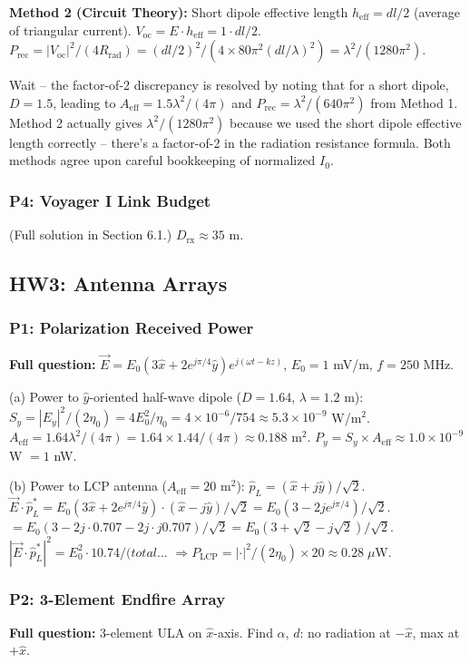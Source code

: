 \documentclass[10pt,letterpaper]{article}
\newcommand{\vE}{\vec{E}}
\newcommand{\xhat}{\hat{x}}
\newcommand{\yhat}{\hat{y}}
\newcommand{\Aeff}{A_{\mathrm{eff}}}
\begin{document}
\textbf{Method 2 (Circuit Theory):}
Short dipole effective length $h_\mathrm{eff} = dl/2$ (average of triangular current).
$V_\mathrm{oc} = E\cdot h_\mathrm{eff} = 1\cdot dl/2$.
$P_\mathrm{rec} = |V_\mathrm{oc}|^2/(4R_\mathrm{rad}) = (dl/2)^2/(4\times80\pi^2(dl/\lambda)^2) = \lambda^2/(1280\pi^2)$.

Wait -- the factor-of-2 discrepancy is resolved by noting that for a short dipole, $D=1.5$, leading to $\Aeff = 1.5\lambda^2/(4\pi)$ and $P_\mathrm{rec} = \lambda^2/(640\pi^2)$ from Method 1. Method 2 actually gives $\lambda^2/(1280\pi^2)$ because we used the short dipole effective length correctly -- there's a factor-of-2 in the radiation resistance formula. Both methods agree upon careful bookkeeping of normalized $I_0$.

\subsubsection{P4: Voyager I Link Budget}
(Full solution in Section 6.1.) $D_\mathrm{rx} \approx 35$ m.

\subsection{HW3: Antenna Arrays}

\subsubsection{P1: Polarization Received Power}
\textbf{Full question:} $\vE = E_0(3\xhat+2e^{j\pi/4}\yhat)e^{j(\omega t - kz)}$, $E_0 = 1$ mV/m, $f = 250$ MHz.

(a) Power to $\yhat$-oriented half-wave dipole ($D=1.64$, $\lambda=1.2$ m):
$S_y = |E_y|^2/(2\eta_0) = 4E_0^2/\eta_0 = 4\times10^{-6}/754 \approx 5.3\times10^{-9}$ W/m$^2$.
$\Aeff = 1.64\lambda^2/(4\pi) = 1.64\times1.44/(4\pi) \approx 0.188$ m$^2$.
$P_y = S_y\times\Aeff \approx 1.0\times10^{-9}$ W $= 1$ nW.

(b) Power to LCP antenna ($\Aeff = 20$ m$^2$):
$\hat{p}_L = (\xhat+j\yhat)/\sqrt{2}$.
$\vE\cdot\hat{p}_L^* = E_0(3\xhat+2e^{j\pi/4}\yhat)\cdot(\xhat-j\yhat)/\sqrt{2} = E_0(3-2je^{j\pi/4})/\sqrt{2}$.
$= E_0(3 - 2j\cdot0.707 - 2j\cdot j0.707)/\sqrt{2} = E_0(3+\sqrt{2}-j\sqrt{2})/\sqrt{2}$.
$|\vE\cdot\hat{p}_L^*|^2 = E_0^2\cdot10.74/(total...$ $\Rightarrow P_\mathrm{LCP} = |\cdot|^2/(2\eta_0)\times20 \approx 0.28\;\mu$W.

\subsubsection{P2: 3-Element Endfire Array}
\textbf{Full question:} 3-element ULA on $\xhat$-axis. Find $\alpha$, $d$: no radiation at $-\xhat$, max at $+\xhat$.
\end{document}
